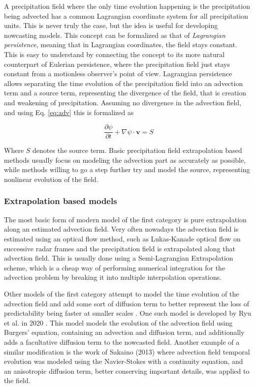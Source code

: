 A precipitation field where the only time evolution happening is the precipitation being advected has a common Lagrangian coordinate system for all precipitation units. This is never truly the case, but the idea is useful for developing nowcasting models. This concept can be formalized as that of \textit{Lagrangian persistence}, meaning that in Lagrangian coordinates, the field stays constant. This is easy to understand by connecting the concept to its more natural counterpart of Eulerian persistence, where the precipitation field just stays constant from a motionless observer's point of view. Lagrangian persistence allows separating the time evolution of the precipitation field into an advection term and a source term, representing the divergence of the field, that is creation and weakening of precipitation. Assuming no divergence in the advection field, and using Eq. \ref{eq:adv} this is formalized as 

\begin{equation}
\
\frac{\partial \psi}{\partial t} + \nabla \psi \cdot \pmb{v} = S 
\end{equation}

Where $S$ denotes the source term. Basic precipitation field extrapolation based methods usually focus on modeling the advection part as accurately as possible, while methods willing to go a step further try and model the source, representing nonlinear evolution of the field. 

\subsubsection*{Extrapolation based models}

The most basic form of modern model of the first category is pure extrapolation along an estimated advection field. Very often nowadays the advection field is estimated using an optical flow method, such as Lukas-Kanade optical flow \cite{lucas1981iterative} on successive radar frames and the precipitation field is extrapolated along that advection field. This is usually done using a Semi-Lagrangian Extrapolation scheme, which is a cheap way of performing numerical integration for the advection problem by breaking it into multiple interpolation operations. 

Other models of the first category attempt to model the time evolution of the advection field and add some sort of diffusion term to better represent the loss of predictability being faster at smaller scales \cite{germann2002scale}. One such model is developed by Ryu et al. in 2020 \cite{ryu_improved_2020}. This model models the evolution of the advection field using Burgers' equation, containing an advection and diffusion term, and additionally adds a facultative diffusion term to the nowcasted field. Another example of a similar modification is the work of Sakaino (2013) \cite{sakaino_spatio-temporal_2013} where advection field temporal evolution was modeled using the Navier-Stokes with a continuity equation, and an anisotropic diffusion term, better conserving important details, was applied to the field. 

